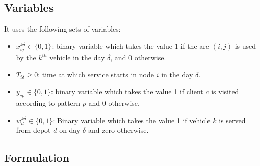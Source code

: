 \documentclass[preprint,review,12pt]{elsarticle}
\begin{document}
\subsection{Variables}
It uses the following sets of variables:

\begin{itemize}
	\item  $x_{ij}^{k\delta}  \in  \{ 0,1 \}$: binary variable which takes the value 1 if the arc $(i,j)$ is used by the $k^{th}$ vehicle in the day $\delta$, and 0 otherwise. 
	\item $T_{i\delta} \geq 0$: time at which service starts in node $i$ in the day $\delta$. 
	\item $y_{cp} \in  \{ 0,1 \}$: binary variable which takes the value 1 if client $c$ is visited according to pattern $p$ and 0 otherwise.
	\item  $w_d^{k\delta} \in  \{0,1\}$: Binary variable which takes the value 1 if vehicle $k$ is served from depot $d$ on day $\delta$ and zero otherwise.
\end{itemize}

\subsection{Formulation}
\end{document}
